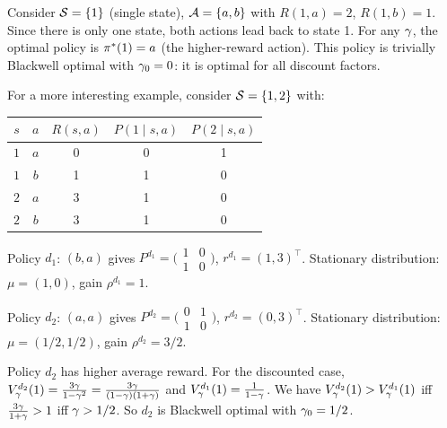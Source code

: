 \documentclass[11pt,a4paper]{article}
\begin{document}
\begin{example}
\label{ex:blackwell}
Consider $\mathcal{S} = \{1\}$ (single state), $\mathcal{A} = \{a, b\}$
with $R(1, a) = 2$, $R(1, b) = 1$. Since there is only one state,
both actions lead back to state 1. For any $\gamma$, the optimal
policy is $\pi^*(1) = a$ (the higher-reward action). This
policy is trivially Blackwell optimal with $\gamma_0 = 0$: it is
optimal for all discount factors.

For a more interesting example, consider $\mathcal{S} = \{1, 2\}$ with:
\begin{center}
\begin{tabular}{ccccc}
\toprule
$s$ & $a$ & $R(s,a)$ & $P(1 \mid s,a)$ & $P(2 \mid s,a)$ \\
\midrule
$1$ & $a$ & 0 & 0 & 1 \\
$1$ & $b$ & 1 & 1 & 0 \\
$2$ & $a$ & 3 & 1 & 0 \\
$2$ & $b$ & 3 & 1 & 0 \\
\bottomrule
\end{tabular}
\end{center}
Policy $d_1$: $(b, a)$ gives $P^{d_1} = \bigl(\begin{smallmatrix}
1 & 0 \\ 1 & 0 \end{smallmatrix}\bigr)$, $r^{d_1} = (1, 3)^\top$.
Stationary distribution: $\mu = (1, 0)$, gain $\rho^{d_1} = 1$.

Policy $d_2$: $(a, a)$ gives $P^{d_2} = \bigl(\begin{smallmatrix}
0 & 1 \\ 1 & 0 \end{smallmatrix}\bigr)$, $r^{d_2} = (0, 3)^\top$.
Stationary distribution: $\mu = (1/2, 1/2)$, gain
$\rho^{d_2} = 3/2$.

Policy $d_2$ has higher average reward. For the discounted case,
$V^{d_2}_\gamma(1) = \frac{3\gamma}{1-\gamma^2} =
\frac{3\gamma}{(1-\gamma)(1+\gamma)}$ and
$V^{d_1}_\gamma(1) = \frac{1}{1-\gamma}$. We have
$V^{d_2}_\gamma(1) > V^{d_1}_\gamma(1)$ iff
$\frac{3\gamma}{1+\gamma} > 1$ iff $\gamma > 1/2$.
So $d_2$ is Blackwell optimal with $\gamma_0 = 1/2$.
\end{example}

\end{document}
